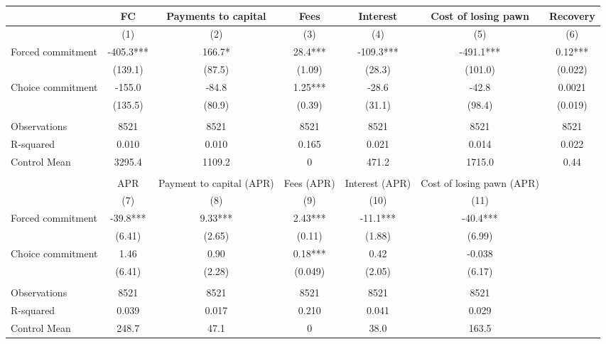 \begin{tabular}{lcccccc}
\toprule
      & FC    & Payments to capital & Fees  & Interest & Cost of losing pawn & Recovery \\
\midrule
      & (1)   & (2)   & (3)   & (4)   & (5)   & (6) \\
\midrule
\midrule
Forced commitment & -405.3*** & 166.7* & 28.4*** & -109.3*** & -491.1*** & 0.12*** \\
      & (139.1) & (87.5) & (1.09) & (28.3) & (101.0) & (0.022) \\
Choice commitment & -155.0 & -84.8 & 1.25*** & -28.6 & -42.8 & 0.0021 \\
      & (135.5) & (80.9) & (0.39) & (31.1) & (98.4) & (0.019) \\
      &       &       &       &       &       &  \\
\midrule
Observations & 8521  & 8521  & 8521  & 8521  & 8521  & 8521 \\
R-squared & 0.010 & 0.010 & 0.165 & 0.021 & 0.014 & 0.022 \\
Control Mean & 3295.4 & 1109.2 & 0     & 471.2 & 1715.0 & 0.44 \\
\midrule
\midrule
      &       &       &       &       &       &  \\
\cmidrule{1-6}      & APR   & Payment to capital (APR) & Fees (APR) & Interest (APR) & Cost of losing pawn (APR) &  \\
\cmidrule{1-6}      & (7)   & (8)   & (9)   & (10)  & (11)  &  \\
\cmidrule{1-6}Forced commitment & -39.8*** & 9.33*** & 2.43*** & -11.1*** & -40.4*** &  \\
      & (6.41) & (2.65) & (0.11) & (1.88) & (6.99) &  \\
Choice commitment & 1.46  & 0.90  & 0.18*** & 0.42  & -0.038 &  \\
      & (6.41) & (2.28) & (0.049) & (2.05) & (6.17) &  \\
      &       &       &       &       &       &  \\
\cmidrule{1-6}Observations & 8521  & 8521  & 8521  & 8521  & 8521  &  \\
R-squared & 0.039 & 0.017 & 0.210 & 0.041 & 0.029 &  \\
Control Mean & 248.7 & 47.1  & 0     & 38.0  & 163.5 &  \\
\cmidrule{1-6}\end{tabular}%
